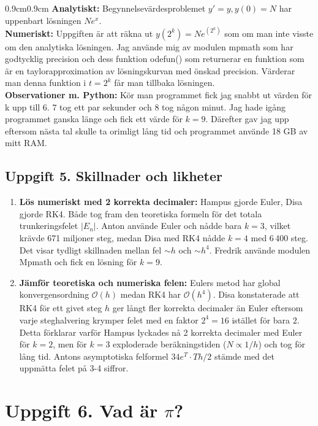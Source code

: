 \documentclass{article}
\begin{document}
\begin{adjustwidth}{0.9cm}{0.9cm}
\textbf{Analytiskt:} Begynnelsevärdesproblemet $y'=y, y(0)=N$ har uppenbart lösningen $Ne^x$. 
\medskip\\
\textbf{Numeriskt:} Uppgiften är att räkna ut $y(2^k)=Ne^{(2^k)}$ som om man inte visste om den analytiska lösningen. Jag använde mig av modulen mpmath som har godtycklig precision och dess funktion odefun() som returnerar en funktion som är en taylorapproximation av lösningskurvan med önskad precision. Värderar man denna funktion i $t=2^k$ får man tillbaka lösningen. 
\medskip\\
\textbf{Observationer m. Python:} Kör man programmet fick jag snabbt ut värden för k upp till 6. 7 tog ett par sekunder och 8 tog någon minut. Jag hade igång programmet ganska länge och fick ett värde för $k=9$. Därefter gav jag upp eftersom nästa tal skulle ta orimligt lång tid och programmet använde 18 GB av mitt RAM.
\end{adjustwidth}

\subsection*{Uppgift 5. Skillnader och likheter}

\begin{enumerate}
    \item \textbf{Lös numeriskt med 2 korrekta decimaler:} Hampus gjorde Euler, Disa gjorde RK4. Både tog fram den teoretiska formeln för det totala trunkeringsfelet $|E_n|$. Anton använde Euler och nådde bara $k = 3$, vilket krävde 671 miljoner steg,
    medan Disa med RK4 nådde $k = 4$ med 6\,400 steg. Det visar tydligt skillnaden
    mellan fel $\sim h$ och $\sim h^4$. Fredrik använde modulen Mpmath och fick en lösning för $k=9$. 
    \item \textbf{Jämför teoretiska och numeriska felen:} 
    Eulers metod har global konvergensordning $\mathcal{O}(h)$ medan RK4 har $\mathcal{O}(h^4)$. Disa konstaterade att RK4 för ett givet steg $h$ ger långt fler korrekta decimaler än Euler eftersom varje steghalvering krymper felet med en faktor $2^4 = 16$ istället för bara $2$. Detta förklarar varför Hampus lyckades nå 2 korrekta decimaler med Euler för $k=2$, men för $k=3$ exploderade beräkningstiden ($N \propto 1/h$) och tog för lång tid. Antons asymptotiska felformel $34e^{T} \cdot Th/2$ stämde med det uppmätta felet på 3-4 siffror. 
\end{enumerate}

\section*{Uppgift 6. Vad är $\pi$?}
\end{document}
